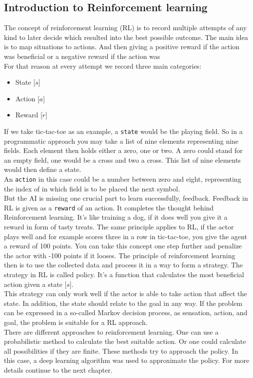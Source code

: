 \documentclass[12pt]{article}
\begin{document}
\subsection{Introduction to Reinforcement learning}
The concept of \gls{reinforcement learning} (RL) is to record multiple attempts of any kind to later decide which resulted into the best possible outcome. The main idea is to map situations to actions. And then giving a positive \gls{reward} if the action was beneficial or a negative \gls{reward} if the action was  \cite{suttonreinforcement} \\
For that reason at every attempt we record three main categories: 
\begin{itemize}
    \item State [$s$]
    \item Action [$a$]
    \item Reward [$r$]
\end{itemize}
If we take tic-tac-toe as an example, a \lstinline{state} would be the playing field. So in a programmatic approach you may take a list of nine elements representing nine fields. Each element then holds either a zero, one or two. A zero could stand for an empty field, one would be a cross and two a cross. This list of nine elements would then define a \gls{state}. \\
An \lstinline{action} in this case could be a number between zero and eight, representing the index of in which field is to be placed the next symbol.\\
But the \gls{AI} is missing one crucial part to learn successfully, feedback. Feedback in RL is given as a \lstinline{reward} of an action. It completes the thought behind Reinforcement learning. It's like training a dog, if it does well you give it a \gls{reward} in form of tasty treats. The same principle applies to RL, if the actor plays well and for example scores three in a row in tic-tac-toe, you give the agent a \gls{reward} of 100 points. You can take this concept one step further and penalize the actor with -100 points if it looses. The principle of \gls{reinforcement learning} then is to use the collected data and process it in a way to form a strategy. The strategy in RL is called \gls{policy}. It's a function that calculates the most beneficial action given a \gls{state} [$s$]. \cite{rl_tictactoe} \\
This strategy can only work well if the actor is able to take action that affect the \gls{state}. In addition, the \gls{state} should relate to the goal in any way. If the problem can be expressed in a so-called \gls{Markov decision process}, as sensation, action, and goal, the problem is suitable for a RL approach.
\cite{suttonreinforcement} \\
There are different approaches to \gls{reinforcement learning}. One can use a probabilistic method to calculate the best suitable action. Or one could calculate all possibilities if they are finite. These methods try to approach the \gls{policy}. In this case, a \gls{deep learning} algorithm was used to approximate the \gls{policy}. For more details continue to the next chapter.
\cite{rl_overview}
\end{document}
